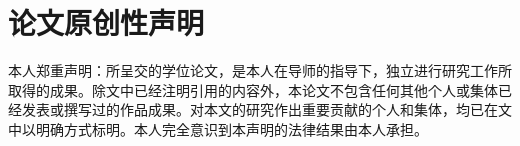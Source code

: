 {\begin{titlepage}
\begin{center}
 \begin{spacing}{2.0}
 \vspace*{42pt}
  \setlength{\@title@width}{5cm}
  {\sanhao{}
 }
 \end{spacing}
 \vspace*{30pt}

  \vspace*{21pt}

\song{}
\end{center}
\end{titlepage}

\newpage
\thispagestyle{empty}
\mbox{}


\clearpage
{}
\chapter*{\centering\sanhao\song\bfseries 论文原创性声明}
\song{}
本人郑重声明：所呈交的学位论文，是本人在导师的指导下，独立进行研究工作所取得的成果。除文中已经注明引用的内容外，本论文不包含任何其他个人或集体已经发表或撰写过的作品成果。对本文的研究作出重要贡献的个人和集体，均已在文中以明确方式标明。本人完全意识到本声明的法律结果由本人承担。

\vspace*{40pt}
\begin{flushright}
\setlength{\@title@width}{5cm}
  {\sihao{}
 }
\end{flushright}

}
